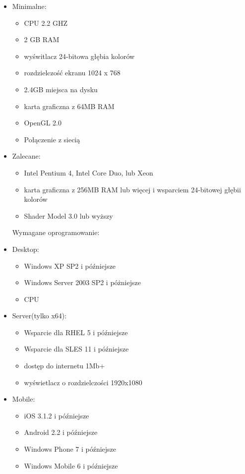 \documentclass[11pt,a4paper]{article}
\begin{document}
\begin{itemize}
	\item Minimalne:
		\begin{itemize}
		\item CPU 2.2 GHZ
    		\item 2 GB RAM
		\item wyświtlacz 24-bitowa głębia kolorów
		\item rozdzielczość ekranu 1024 x 768
		\item 2.4GB miejsca na dysku
		\item karta graficzna z 64MB RAM 
		\item OpenGL 2.0
		\item Połączenie z siecią
		\end{itemize}
	\item Zalecane:
		\begin{itemize}
		\item Intel Pentium 4, Intel Core Duo, lub Xeon 
    		\item karta graficzna z 256MB RAM lub więcej i wsparciem 24-bitowej głębii kolorów
    		\item Shader Model 3.0 lub wyższy
		\end{itemize}
\raggedright{Wymagane oprogramowanie:}		
	\item Desktop:	
		\begin{itemize}
		\item Windows XP SP2 i późniejsze
    		\item Windows Server 2003 SP2 i póżniejsze
    		\item CPU 
		\end{itemize}
	\item Server(tylko x64): 
		\begin{itemize}
		\item Wsparcie dla RHEL 5 i późniejsze
    		\item Wsparcie dla SLES 11 i późniejsze
    		\item dostęp do internetu 1Mb+
    		\item wyświetlacz o rozdzielczości 1920x1080
		\end{itemize}
	\item Mobile: 
		\begin{itemize}
		\item iOS 3.1.2 i późniejsze
    		\item Android 2.2 i późniejsze
    		\item Windows Phone 7 i późniejsze
    		\item Windows Mobile 6 i późniejsze 
		\end{itemize}
\end{itemize}
\raggedright
\end{document}

